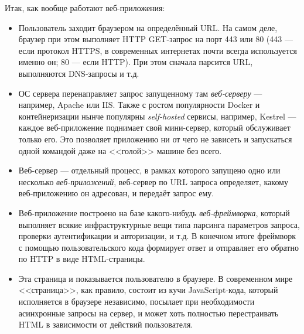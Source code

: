 \documentclass[a5paper]{article}
\begin{document}
Итак, как вообще работают веб-приложения:

\begin{itemize}
    \item Пользователь заходит браузером на определённый URL. На самом деле, браузер при этом выполняет HTTP GET-запрос на порт 443 или 80 (443 --- если протокол HTTPS, в современных интернетах почти всегда используется именно он; 80 --- если HTTP). При этом сначала парсится URL, выполняются DNS-запросы и т.д.
    \item ОС сервера перенаправляет запрос запущенному там \emph{веб-серверу} --- например, Apache или IIS. Также с ростом популярности Docker и контейнеризации нынче популярны \emph{self-hosted} сервисы, например, Kestrel --- каждое веб-приложение поднимает свой мини-сервер, который обслуживает только его. Это позволяет приложению ни от чего не зависеть и запускаться одной командой даже на <<голой>> машине без всего.
    \item Веб-сервер --- отдельный процесс, в рамках которого запущено одно или несколько \emph{веб-приложений}, веб-сервер по URL запроса определяет, какому веб-приложению он адресован, и передаёт запрос ему.
    \item Веб-приложение построено на базе какого-нибудь \emph{веб-фреймворка}, который выполняет всякие инфраструктурные вещи типа парсинга параметров запроса, проверки аутентификации и авторизации, и т.д. В конечном итоге фреймворк с помощью пользовательского кода формирует ответ и отправляет его обратно по HTTP в виде HTML-страницы.
    \item Эта страница и показывается пользователю в браузере. В современном мире <<страница>>, как правило, состоит из кучи JavaScript-кода, который исполняется в браузере независимо, посылает при необходимости асинхронные запросы на сервер, и может хоть полностью перестраивать HTML в зависимости от действий пользователя.
\end{itemize}
\end{document}
